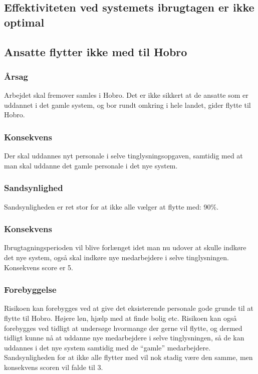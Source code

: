 \documentclass[10pt,a4paper,danish]{article}
\begin{document}
\subsection{Effektiviteten ved systemets ibrugtagen er ikke optimal}


\subsection{Ansatte flytter ikke med til Hobro}
\subsubsection{Årsag}
Arbejdet skal fremover samles i Hobro. Det er ikke sikkert at de ansatte som er uddannet i det gamle system, og bor rundt omkring i hele landet, gider flytte til Hobro.

\subsubsection{Konsekvens}
Der skal uddannes nyt personale i selve tinglysningsopgaven, samtidig med at man skal uddanne det gamle personale i det nye system.

\subsubsection{Sandsynlighed}
Sandsynligheden er ret stor for at ikke alle vælger at flytte med: 90\%.

\subsubsection{Konsekvens}
Ibrugtagningsperioden vil blive forlænget idet man nu udover at skulle indkøre det nye system, også skal indkøre nye medarbejdere i selve tinglysningen. Konsekvens score er 5.

\subsubsection{Forebyggelse}
Risikoen kan forebygges ved at give det eksisterende personale gode grunde til at flytte til Hobro. Højere løn, hjælp med at finde bolig etc. Risikoen kan også forebygges ved tidligt at undersøge hvormange der gerne vil flytte, og dermed tidligt kunne nå at uddanne nye medarbejdere i selve tinglysningen, så de kan uddannes i det nye system samtidig med de "`gamle"' medarbejdere. Sandsynligheden for at ikke alle flytter med vil nok stadig være den samme, men konsekvens scoren vil falde til 3.
\end{document}

